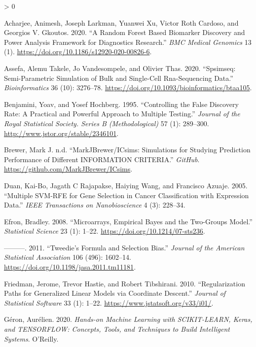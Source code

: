 \documentclass[
]{article}
\newlength{\cslhangindent}
\newenvironment{CSLReferences}[2] %
 {%
  \setlength{\parindent}{0pt}
  \ifodd #1 \everypar{\setlength{\hangindent}{\cslhangindent}}\ignorespaces\fi
  \ifnum #2 > 0
  \setlength{\parskip}{#2\baselineskip}
  \fi
 }%
 {}
\begin{document}
\hypertarget{refs}{}
\begin{CSLReferences}{1}{0}
\leavevmode\hypertarget{ref-acharjee2020}{}%
Acharjee, Animesh, Joseph Larkman, Yuanwei Xu, Victor Roth Cardoso, and Georgios V. Gkoutos. 2020. {``A Random Forest Based Biomarker Discovery and Power Analysis Framework for Diagnostics Research.''} \emph{BMC Medical Genomics} 13 (1). \url{https://doi.org/10.1186/s12920-020-00826-6}.

\leavevmode\hypertarget{ref-simseq}{}%
Assefa, Alemu Takele, Jo Vandesompele, and Olivier Thas. 2020. {``Spsimseq: Semi-Parametric Simulation of Bulk and Single-Cell Rna-Sequencing Data.''} \emph{Bioinformatics} 36 (10): 3276--78. \url{https://doi.org/10.1093/bioinformatics/btaa105}.

\leavevmode\hypertarget{ref-BH1995}{}%
Benjamini, Yoav, and Yosef Hochberg. 1995. {``Controlling the False Discovery Rate: A Practical and Powerful Approach to Multiple Testing.''} \emph{Journal of the Royal Statistical Society. Series B (Methodological)} 57 (1): 289--300. \url{http://www.jstor.org/stable/2346101}.

\leavevmode\hypertarget{ref-ICsims}{}%
Brewer, Mark J. n.d. {``MarkJBrewer/ICsims: Simulations for Studying Prediction Performance of Different INFORMATION CRITERIA.''} \emph{GitHub}. \url{https://github.com/MarkJBrewer/ICsims}.

\leavevmode\hypertarget{ref-svmrfe}{}%
Duan, Kai-Bo, Jagath C Rajapakse, Haiying Wang, and Francisco Azuaje. 2005. {``Multiple SVM-RFE for Gene Selection in Cancer Classification with Expression Data.''} \emph{IEEE Transactions on Nanobioscience} 4 (3): 228--34.

\leavevmode\hypertarget{ref-efron2008}{}%
Efron, Bradley. 2008. {``Microarrays, Empirical Bayes and the Two-Groups Model.''} \emph{Statistical Science} 23 (1): 1--22. \url{https://doi.org/10.1214/07-sts236}.

\leavevmode\hypertarget{ref-efron2011}{}%
---------. 2011. {``Tweedie's Formula and Selection Bias.''} \emph{Journal of the American Statistical Association} 106 (496): 1602--14. \url{https://doi.org/10.1198/jasa.2011.tm11181}.

\leavevmode\hypertarget{ref-glmnet}{}%
Friedman, Jerome, Trevor Hastie, and Robert Tibshirani. 2010. {``Regularization Paths for Generalized Linear Models via Coordinate Descent.''} \emph{Journal of Statistical Software} 33 (1): 1--22. \url{https://www.jstatsoft.org/v33/i01/}.

\leavevmode\hypertarget{ref-hands_on_ml}{}%
Géron, Aurélien. 2020. \emph{Hands-on Machine Learning with SCIKIT-LEARN, Keras, and TENSORFLOW: Concepts, Tools, and Techniques to Build Intelligent Systems}. O'Reilly.


\end{CSLReferences}
\end{document}
